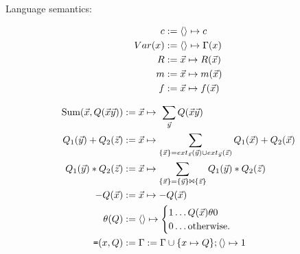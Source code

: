 \noindent Language semantics:

\begin{align*}
c                   := & \; \tuple{} \mapsto c\\
Var(x)              := & \; \tuple{} \mapsto \Gamma(x)\\
R                   := & \; \vec{x} \mapsto R(\vec{x})\\
m                   := & \; \vec{x} \mapsto m(\vec{x}) \\
\comment{
\theta(x,y)         := & \; \tuple{x,y} \mapsto
                           \begin{cases}
                           1 \ldots x \; \theta \; y \\
                           0 \ldots \mbox{otherwise.}
                           \end{cases}\\
\theta_c(x)         := & \; \tuple{x} \mapsto
                           \begin{cases}
                           1 \ldots x \; \theta \; c \\
                           0 \ldots \mbox{otherwise.}
                           \end{cases}\\
\calceq(\q,y)       := & \; \tuple{y} \mapsto \q(\tuple{}) \\
\calceq(x,y)        := & \; \tuple{y} \mapsto \Gamma(x) \\
}
f                   := & \; \vec{x} \mapsto f(\vec{x}) \\
\end{align*}

\begin{align*}
\mbox{Sum}(\vec{x}, Q(\vec{x}\vec{y})) := & \;
\vec{x} \mapsto \ \sum_{\vec{y}} Q(\vec{x}\vec{y})
\\
Q_1(\vec{y}) + Q_2(\vec{z}) := & \;
\vec{x} \mapsto 
\sum_{\{\vec{x}\} = ext_{\vec{z}}(\vec{y}) \cup ext_{\vec{y}}(\vec{z})}
Q_1(\vec{x}) + Q_2(\vec{x})
\\
Q_1(\vec{y}) * Q_2(\vec{z}) := & \;
\vec{x} \mapsto \sum_{ \{\vec{x}\} = \{\vec{y}\} \Join \{\vec{z}\} }
Q_1(\vec{y}) * Q_2(\vec{z})
\\
-Q(\vec{x}) := & \; \vec{x} \mapsto -Q(\vec{x})
\\
\theta(Q) := & \; {\langle\rangle} \mapsto
                    \begin{cases}
                    1 \ldots Q(\vec{x}) \theta 0\\
                    0 \ldots \mbox{otherwise.}
                    \end{cases}
\\
\mbox{{\tt =}}(x,Q) := & \; \Gamma := \Gamma \cup \{x \mapsto Q\};
                  {\langle\rangle} \mapsto 1
\end{align*}

